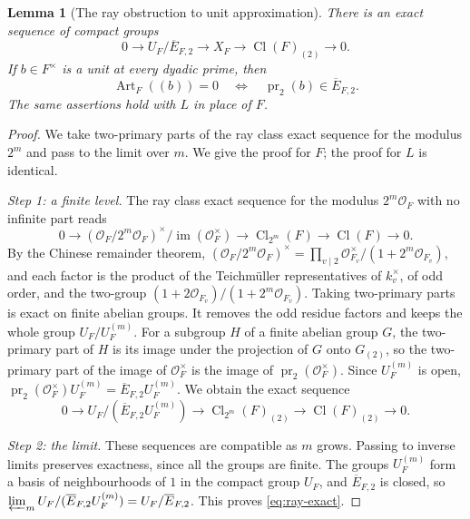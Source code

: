\documentclass[11pt]{article}
\theoremstyle{plain}
\newtheorem{lemma}[theorem]{Lemma}
\theoremstyle{definition}
\theoremstyle{remark}
\DeclareMathOperator{\Cl}{Cl}
\newcommand{\OO}{\mathcal O}
\begin{document}
\begin{lemma}[The ray obstruction to unit approximation]\label{lem:ray-closure}
There is an exact sequence of compact groups
\begin{equation}\label{eq:ray-exact}
 0\longrightarrow U_F/\overline E_{F,2}
 \longrightarrow X_F\longrightarrow\Cl(F)_{(2)}\longrightarrow0.
\end{equation}
If $b\in F^\times$ is a unit at every dyadic prime, then
\begin{equation}\label{eq:ray-principal}
 \operatorname{Art}_F((b))=0
 \quad\Longleftrightarrow\quad
 \operatorname{pr}_2(b)\in\overline E_{F,2}.
\end{equation}
The same assertions hold with $L$ in place of $F$.
\end{lemma}

\begin{proof}
We take two-primary parts of the ray class exact sequence for the modulus
$2^m$ and pass to the limit over $m$.  We give the proof for $F$; the
proof for $L$ is identical.

\emph{Step 1: a finite level.}  The ray class exact sequence
\cite[Chapter~V, Theorem~1.7]{MilneCFT} for the modulus $2^m\OO_F$ with no
infinite part reads
\[
 0\longrightarrow(\OO_F/2^m\OO_F)^\times/\operatorname{im}(\OO_F^\times)
 \longrightarrow\Cl_{2^m}(F)\longrightarrow\Cl(F)\longrightarrow0.
\]
By the Chinese remainder theorem,
$(\OO_F/2^m\OO_F)^\times=\prod_{v\mid2}\OO_{F_v}^\times/(1+2^m\OO_{F_v})$,
and each factor is the product of the Teichm\"uller representatives of
$k_v^\times$, of odd order, and the two-group
$(1+2\OO_{F_v})/(1+2^m\OO_{F_v})$.  Taking two-primary parts is exact on
finite abelian groups.  It removes the odd residue factors and keeps the
whole group $U_F/U_F^{(m)}$.  For a subgroup $H$ of a finite abelian group
$G$, the two-primary part of $H$ is its image under the projection of $G$
onto $G_{(2)}$, so the two-primary part of the image of $\OO_F^\times$ is
the image of $\operatorname{pr}_2(\OO_F^\times)$.  Since $U_F^{(m)}$ is
open, $\operatorname{pr}_2(\OO_F^\times)U_F^{(m)}=\overline
E_{F,2}U_F^{(m)}$.  We obtain the exact sequence
\[
 0\longrightarrow
 U_F/(\overline E_{F,2}U_F^{(m)})
 \longrightarrow \Cl_{2^m}(F)_{(2)}
 \longrightarrow\Cl(F)_{(2)}\longrightarrow0.
\]

\emph{Step 2: the limit.}  These sequences are compatible as $m$ grows.
Passing to inverse limits preserves exactness, since all the groups are
finite.  The groups $U_F^{(m)}$ form a basis of neighbourhoods of $1$ in
the compact group $U_F$, and $\overline E_{F,2}$ is closed, so
$\varprojlim_mU_F/(\overline E_{F,2}U_F^{(m)})=U_F/\overline E_{F,2}$.
This proves \eqref{eq:ray-exact}.


\end{proof}
\end{document}
